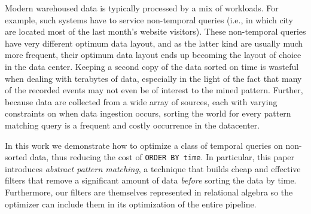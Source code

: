 Modern warehoused data is typically processed by a mix of workloads.  For
example, such systems have to service non-temporal queries (i.e., in which city
are located most of the last month's website visitors).  These non-temporal
queries have very different optimum data layout, and as the latter kind are
usually much more frequent, their optimum data layout ends up becoming the
layout of choice in the data center.  Keeping a second copy of the data sorted
on time is wasteful when dealing with terabytes of data, especially in the light
of the fact that many of the recorded events may not even be of interest to the
mined pattern.  Further, because data are collected from a wide array of
sources, each with varying constraints on when data ingestion occurs, sorting
the world for every pattern matching query is a frequent and costly occurrence
in the datacenter.
%

In this work we demonstrate how to optimize a class of temporal queries on
non-sorted data, thus reducing the cost of \texttt{ORDER BY time}. In
particular, this paper introduces {\em abstract pattern matching}, a technique
that builds cheap and effective filters that remove a significant amount of data
\emph{before} sorting the data by time.  Furthermore, our filters are themselves
represented in relational algebra so the optimizer can include them in its
optimization of the entire pipeline.


